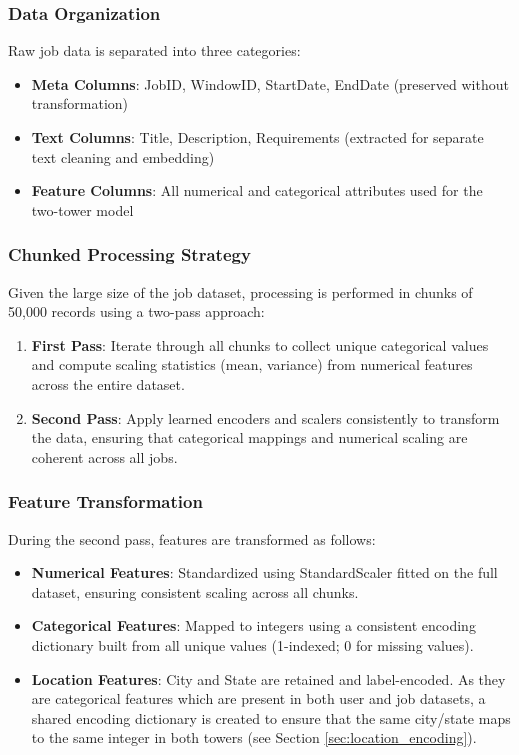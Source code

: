\subsubsection{Data Organization}

Raw job data is separated into three categories:
\begin{itemize}
    \item \textbf{Meta Columns}: JobID, WindowID, StartDate, EndDate (preserved without transformation)
    \item \textbf{Text Columns}: Title, Description, Requirements (extracted for separate text cleaning and embedding)
    \item \textbf{Feature Columns}: All numerical and categorical attributes used for the two-tower model
\end{itemize}

\subsubsection{Chunked Processing Strategy}

Given the large size of the job dataset, processing is performed in chunks of 50,000 records using a two-pass approach:

\begin{enumerate}
    \item \textbf{First Pass}: Iterate through all chunks to collect unique categorical values and compute scaling statistics (mean, variance) from numerical features across the entire dataset.
    \item \textbf{Second Pass}: Apply learned encoders and scalers consistently to transform the data, ensuring that categorical mappings and numerical scaling are coherent across all jobs.
\end{enumerate}

\subsubsection{Feature Transformation}

During the second pass, features are transformed as follows:

\begin{itemize}
    \item \textbf{Numerical Features}: Standardized using StandardScaler fitted on the full dataset, ensuring consistent scaling across all chunks.
    \item \textbf{Categorical Features}: Mapped to integers using a consistent encoding dictionary built from all unique values (1-indexed; 0 for missing values).
    \item \textbf{Location Features}: City and State are retained and label-encoded. As they are categorical features which are present in both user and job datasets, a shared encoding dictionary is created to ensure that the same city/state maps to the same integer in both towers (see Section \ref{sec:location_encoding}).
\end{itemize}

